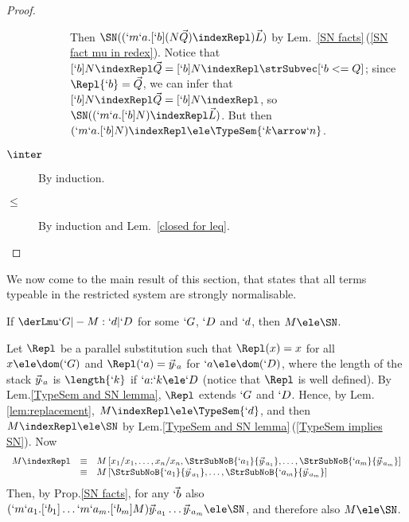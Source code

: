 \documentclass{CSML}
\newcommand{\vect}[1]{\vec{#1}}
\begin{document}
\begin{proof}
\begin{description}
\begin{description}
Then $ \SN({ (`m`a.[`b](N\vect{Q}){\indexRepl})\vect{L} }) $ by Lem.~\ref{SN facts}\,(\ref{SN fact mu in redex}).
Notice that $[`b]N{\indexRepl} \vect{Q} = [`b]N{\indexRepl} \strSubvec[ `b <= Q ] $; since $\Repl{`b} = \vect{Q}$, we can infer that $[`b]N{\indexRepl} \vect{Q} = [`b]N{\indexRepl} $, so $ \SN({ (`m`a.[`b]N){\indexRepl} \vect{L} }) $.
But then $ (`m`a.[`b]N){\indexRepl} \ele \TypeSem{`k\arrow`n} $.
\end{description}


 \item[$\inter$]
By induction.

 \item[$\leq$]
By induction and Lem.~\ref{closed for leq}.
\qedhere 
 \end{description}
\end{proof} 

\noindent We now come to the main result of this section, that states that all terms typeable in the restricted system are strongly normalisable.


 \begin{thm} \label{thm:typableAreSN}
If $\derLmu `G |- M : `d | `D $ for some $`G$, $`D $ and $`d$, then $M \ele \SN$.
 \end{thm}

 \begin{Proof}
Let $ \Repl $ be a parallel substitution such that $ \Repl (x) = x $ for all $ x \ele \dom(`G)$ and $ \Repl (`a) = \vect{y}_{`a} $ for $ `a \ele \dom(`D) $, where the length of the stack $ \vect{y}_{`a}$ is $\length{`k}$ if $`a{:}`k \ele `D $
(notice that $\Repl$ is well defined).
By Lem.\skp\ref{TypeSem and SN lemma}, $ \Repl $ extends $`G$ and $`D $.
Hence, by Lem.\skp\ref{lem:replacement}, $M \indexRepl \ele \TypeSem{`d}$,
and then $M \indexRepl \ele \SN$ by Lem.\skp\ref{TypeSem and SN lemma}\,(\ref{TypeSem implies SN}).
Now 
%
 \[ \begin{array}{rcl}
M \indexRepl 
	&\equiv& 
M \,[ x_1/ x_1, \ldots, x_n/x_n, \StrSubNoB{`a_1}{\vect{y}_{`a_1}}, \ldots, \StrSubNoB{`a_m}{\vect{y}_{`a_m}}] \\
	&\equiv& 
M \,[ \StrSubNoB{`a_1}{\vect{y}_{`a_1}}, \ldots, \StrSubNoB{`a_m}{\vect{y}_{`a_m}}] 
 \end{array} \]
Then, by Prop.\skp\ref{SN facts}, for any $\vect{`b}$ also $(`m`a_1.[`b_1]\dots `m`a_m.[`b_m]M) \vect{y}_{`a_1} \dots \vect{y}_{`a_m} \ele \SN$, and therefore also $M \ele \SN$. %
 \end{Proof}
\end{document}
